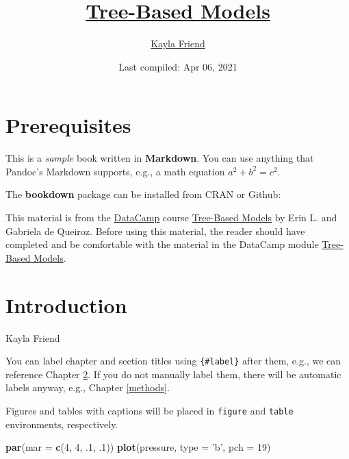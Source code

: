 \documentclass[
]{book}
\title{\href{https://learn.datacamp.com/courses/tree-based-models-in-r}{Tree-Based Models}}
\author{\href{https://kaylafriend.github.io/}{Kayla Friend}}
\date{Last compiled: Apr 06, 2021}
\newenvironment{Shaded}{\begin{snugshade}}{\end{snugshade}}
\newcommand{\DataTypeTok}[1]{\textcolor[rgb]{0.13,0.29,0.53}{#1}}
\newcommand{\DecValTok}[1]{\textcolor[rgb]{0.00,0.00,0.81}{#1}}
\newcommand{\FloatTok}[1]{\textcolor[rgb]{0.00,0.00,0.81}{#1}}
\newcommand{\KeywordTok}[1]{\textcolor[rgb]{0.13,0.29,0.53}{\textbf{#1}}}
\newcommand{\NormalTok}[1]{#1}
\newcommand{\StringTok}[1]{\textcolor[rgb]{0.31,0.60,0.02}{#1}}
\begin{document}
\maketitle

{
\setcounter{tocdepth}{1}
\tableofcontents
}
\hypertarget{prerequisites}{%
\chapter{Prerequisites}\label{prerequisites}}

This is a \emph{sample} book written in \textbf{Markdown}. You can use anything that Pandoc's Markdown supports, e.g., a math equation \(a^2 + b^2 = c^2\).

The \textbf{bookdown} package can be installed from CRAN or Github:

This material is from the \href{https://www.datacamp.com}{DataCamp} course \href{https://learn.datacamp.com/courses/tree-based-models-in-r}{Tree-Based Models} by Erin L. and Gabriela de Queiroz. Before using this material, the reader should have completed and be comfortable with the material in the DataCamp module \href{https://learn.datacamp.com/courses/tree-based-models-in-r}{Tree-Based Models}.

\hypertarget{intro}{%
\chapter{Introduction}\label{intro}}

Kayla Friend

You can label chapter and section titles using \texttt{\{\#label\}} after them, e.g., we can reference Chapter \ref{intro}. If you do not manually label them, there will be automatic labels anyway, e.g., Chapter \ref{methods}.

Figures and tables with captions will be placed in \texttt{figure} and \texttt{table} environments, respectively.

\begin{Shaded}
\begin{Highlighting}[]
\KeywordTok{par}\NormalTok{(}\DataTypeTok{mar =} \KeywordTok{c}\NormalTok{(}\DecValTok{4}\NormalTok{, }\DecValTok{4}\NormalTok{, }\FloatTok{.1}\NormalTok{, }\FloatTok{.1}\NormalTok{))}
\KeywordTok{plot}\NormalTok{(pressure, }\DataTypeTok{type =} \StringTok{'b'}\NormalTok{, }\DataTypeTok{pch =} \DecValTok{19}\NormalTok{)}
\end{Highlighting}
\end{Shaded}
\end{document}
